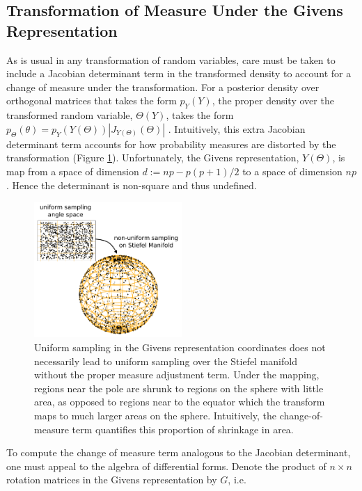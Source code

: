 \documentclass[ba]{imsart}
\numberwithin{equation}{section}
\theoremstyle{plain}
\begin{document}
\subsection{Transformation of Measure Under the Givens Representation}\label{measureGivens}
As is usual in any transformation of random variables, care must be taken to include a Jacobian determinant term in the transformed density to account for a change of measure under the transformation. For a posterior density over orthogonal matrices that takes the form $p_Y(Y)$, the proper density over the transformed random variable, $\Theta(Y)$, takes the form $p_\Theta(\theta) = p_{Y}(Y(\Theta)) |J_{Y(\Theta)}(\Theta)|$ \citep{keener2011theoretical}. Intuitively, this extra Jacobian determinant term accounts for how probability measures are distorted by the transformation (Figure \ref{fig:AreaForm}). Unfortunately, the Givens representation, $Y(\Theta)$, is map from a space of dimension $d := np - p(p+1)/2$ to a space of dimension $np$. Hence the determinant is non-square and thus undefined.

\begin{figure}[h]
\centering
\vspace{.1in}
\includegraphics[width=0.5\textwidth]{figures/AreaForm_atz.pdf}
\vspace{.05in}
\caption{Uniform sampling in the Givens representation coordinates does not necessarily lead to uniform sampling over the Stiefel manifold without the proper measure adjustment term. Under the mapping, regions near the pole are shrunk to regions on the sphere with little area, as opposed to regions near to the equator which the transform maps to much larger areas on the sphere. Intuitively, the change-of-measure term quantifies this proportion of shrinkage in area.}
\label{fig:AreaForm}
\end{figure}


\noindent To compute the change of measure term analogous to the Jacobian determinant, one must appeal to the algebra of differential forms. Denote the product of $n \times n$ rotation matrices in the Givens representation by $G$, i.e. 
\end{document}
